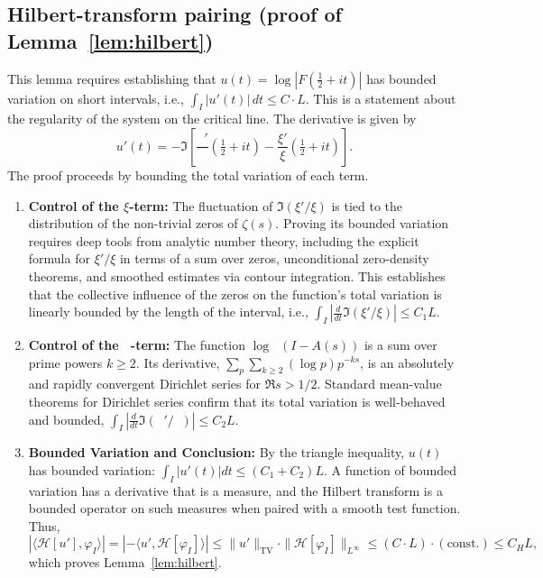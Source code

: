 \documentclass[11pt]{article}
\theoremstyle{remark}
\DeclareMathOperator{\dettwo}{det_2}
\begin{document}
\subsection{Hilbert-transform pairing (proof of Lemma~\ref{lem:hilbert})}
This lemma requires establishing that $u(t)=\log|F(\tfrac12+it)|$ has bounded variation on short intervals, i.e., $\int_I |u'(t)|\,dt \le C\cdot L$. This is a statement about the regularity of the system on the critical line.
The derivative is given by
\[ u'(t) = -\Im\left[ \frac{\dettwo'}{\dettwo}(\tfrac{1}{2}+it) - \frac{\xi'}{\xi}(\tfrac{1}{2}+it) \right]. \]
The proof proceeds by bounding the total variation of each term.
\begin{enumerate}
    \item \textbf{Control of the $\xi$-term:} The fluctuation of $\Im(\xi'/\xi)$ is tied to the distribution of the non-trivial zeros of $\zeta(s)$. Proving its bounded variation requires deep tools from analytic number theory, including the explicit formula for $\xi'/\xi$ in terms of a sum over zeros, unconditional zero-density theorems, and smoothed estimates via contour integration. This establishes that the collective influence of the zeros on the function's total variation is linearly bounded by the length of the interval, i.e., $\int_I |\frac{d}{dt}\Im(\xi'/\xi)| \le C_1 L$.
    \item \textbf{Control of the $\dettwo$-term:} The function $\log\dettwo(I-A(s))$ is a sum over prime powers $k\ge 2$. Its derivative, $\sum_p\sum_{k\ge 2}(\log p)p^{-ks}$, is an absolutely and rapidly convergent Dirichlet series for $\Re s > 1/2$. Standard mean-value theorems for Dirichlet series confirm that its total variation is well-behaved and bounded, $\int_I |\frac{d}{dt}\Im(\dettwo'/\dettwo)| \le C_2 L$.
    \item \textbf{Bounded Variation and Conclusion:} By the triangle inequality, $u(t)$ has bounded variation: $\int_I |u'(t)|dt \le (C_1+C_2)L$. A function of bounded variation has a derivative that is a measure, and the Hilbert transform is a bounded operator on such measures when paired with a smooth test function. Thus,
    \[ |\langle \mathcal{H}[u'], \varphi_I \rangle| = |-\langle u', \mathcal{H}[\varphi_I] \rangle| \le \|u'\|_{\text{TV}} \cdot \|\mathcal{H}[\varphi_I]\|_{L^\infty} \le (C \cdot L) \cdot (\text{const.}) \le C_H L, \]
    which proves Lemma~\ref{lem:hilbert}.
\end{enumerate}
\end{document}
